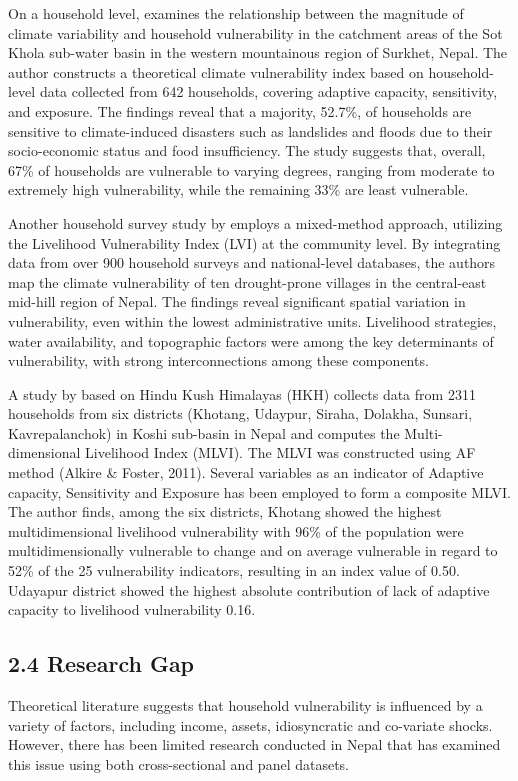 \documentclass[12pt, a4paper]{article}
\begin{document}
On a household level, \cite{bista2019grasping} examines the relationship between the magnitude of climate variability and household vulnerability in the catchment areas of the Sot Khola sub-water basin in the western mountainous region of Surkhet, Nepal. The author constructs a theoretical climate vulnerability index based on household-level data collected from 642 households, covering adaptive capacity, sensitivity, and exposure. The findings reveal that a majority, 52.7\%, of households are sensitive to climate-induced disasters such as landslides and floods due to their socio-economic status and food insufficiency. The study suggests that, overall, 67\% of households are vulnerable to varying degrees, ranging from moderate to extremely high vulnerability, while the remaining 33\% are least vulnerable.


Another household survey study by \cite{mainali2019mapping} employs a mixed-method approach, utilizing the Livelihood Vulnerability Index (LVI) at the community level. By integrating data from over 900 household surveys and national-level databases, the authors map the climate vulnerability of ten drought-prone villages in the central-east mid-hill region of Nepal. The findings reveal significant spatial variation in vulnerability, even within the lowest administrative units. Livelihood strategies, water availability, and topographic factors were among the key determinants of vulnerability, with strong interconnections among these components. 

A study by \cite{gerlitz2017multidimensional} based on Hindu Kush Himalayas (HKH) collects data from 2311 households from six districts (Khotang, Udaypur, Siraha, Dolakha, Sunsari, Kavrepalanchok) in Koshi sub-basin in Nepal and computes the Multi-dimensional Livelihood Index (MLVI). The MLVI was constructed using  AF method (Alkire \& Foster, 2011). Several variables as an indicator of Adaptive capacity, Sensitivity and Exposure has been employed to form a composite MLVI. The author finds, among the six districts, Khotang showed the highest multidimensional livelihood vulnerability with 96\% of the population were multidimensionally vulnerable to change and on average vulnerable in regard to 52\% of the 25 vulnerability indicators, resulting in an index value of 0.50.  Udayapur district showed the highest absolute contribution of lack of adaptive capacity to livelihood vulnerability 0.16.         

\subsection*{2.4 Research Gap}
\renewcommand{\thepage}{\arabic{page}}
Theoretical literature suggests that household vulnerability is influenced by a variety of factors, including income, assets,  idiosyncratic and co-variate shocks. However, there has been limited research conducted in Nepal that has examined this issue using both cross-sectional and panel datasets.  
\end{document}
